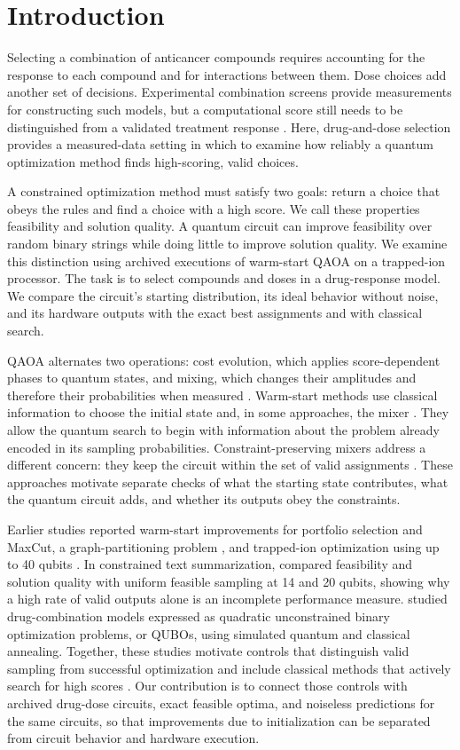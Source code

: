 \documentclass[utf8]{FrontiersinHarvard}
\begin{document}
\section{Introduction}
Selecting a combination of anticancer compounds requires accounting for the response to each compound and for interactions between them. Dose choices add another set of decisions. Experimental combination screens provide measurements for constructing such models, but a computational score still needs to be distinguished from a validated treatment response \citep{menden2019}. Here, drug-and-dose selection provides a measured-data setting in which to examine how reliably a quantum optimization method finds high-scoring, valid choices.

A constrained optimization method must satisfy two goals: return a choice that obeys the rules and find a choice with a high score. We call these properties feasibility and solution quality. A quantum circuit can improve feasibility over random binary strings while doing little to improve solution quality. We examine this distinction using archived executions of warm-start QAOA on a trapped-ion processor. The task is to select compounds and doses in a drug-response model. We compare the circuit's starting distribution, its ideal behavior without noise, and its hardware outputs with the exact best assignments and with classical search.

QAOA alternates two operations: cost evolution, which applies score-dependent phases to quantum states, and mixing, which changes their amplitudes and therefore their probabilities when measured \citep{farhi2014}. Warm-start methods use classical information to choose the initial state and, in some approaches, the mixer \citep{egger2021}. They allow the quantum search to begin with information about the problem already encoded in its sampling probabilities. Constraint-preserving mixers address a different concern: they keep the circuit within the set of valid assignments \citep{hadfield2019}. These approaches motivate separate checks of what the starting state contributes, what the quantum circuit adds, and whether its outputs obey the constraints.

Earlier studies reported warm-start improvements for portfolio selection and MaxCut, a graph-partitioning problem \citep{egger2021}, and trapped-ion optimization using up to 40 qubits \citep{pagano2020}. In constrained text summarization, \citet{niroula2022} compared feasibility and solution quality with uniform feasible sampling at 14 and 20 qubits, showing why a high rate of valid outputs alone is an incomplete performance measure. \citet{ramos2026} studied drug-combination models expressed as quadratic unconstrained binary optimization problems, or QUBOs, using simulated quantum and classical annealing. Together, these studies motivate controls that distinguish valid sampling from successful optimization and include classical methods that actively search for high scores \citep{koch2026,sankar2024}. Our contribution is to connect those controls with archived drug-dose circuits, exact feasible optima, and noiseless predictions for the same circuits, so that improvements due to initialization can be separated from circuit behavior and hardware execution.
\end{document}
